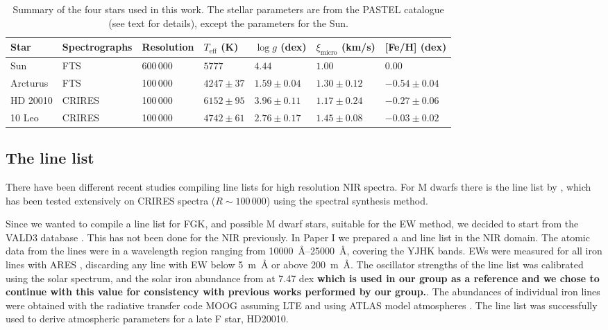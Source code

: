 \documentclass{aa}
\begin{document}
\begin{table}[htb!]
    \caption{Summary of the four stars used in this work. The stellar parameters
             are from the PASTEL catalogue \citep{Soubiran2016} (see text for
             details), except the parameters for the Sun.}
    \label{tab:stars}
    \centering
    \begin{tabular}{lllllll}
      \hline\hline
        Star        & Spectrographs  & Resolution  & $T_\mathrm{eff}$ (K) &  $\log g$ (dex)  &   $\xi_\mathrm{micro}$ (km/s)   & [Fe/H] (dex)      \\
      \hline
        Sun         & FTS            & 600\,000    & $5777$               &  $4.44$          &    $1.00$                       & $ 0.00$          \\
        Arcturus    & FTS            & 100\,000    & $4247 \pm  37$       &  $1.59 \pm 0.04$ &    $1.30 \pm 0.12$              & $-0.54 \pm 0.04$ \\
        HD 20010    & CRIRES         & 100\,000    & $6152 \pm  95$       &  $3.96 \pm 0.11$ &    $1.17 \pm 0.24$              & $-0.27 \pm 0.06$ \\
        10 Leo      & CRIRES         & 100\,000    & $4742 \pm  61$       &  $2.76 \pm 0.17$ &    $1.45 \pm 0.08$              & $-0.03 \pm 0.02$ \\
      \hline
    \end{tabular}
\end{table}

\subsection{The line list}

There have been different recent studies compiling line lists for high resolution NIR spectra. For M
dwarfs there is the line list by \citet{Onehag2012,Lindgren2016}, which has been tested extensively
on CRIRES spectra ($R\sim100\,000$) using the spectral synthesis method.

Since we wanted to compile a line list for FGK, and possible M dwarf stars, suitable for the EW
method, we decided to start from the VALD3 database \citep{VALD1,VALD2}. This has not been done for
the NIR previously. In Paper I we prepared a  and  line list in the NIR
domain. The atomic data from the lines were in a wavelength region ranging from
\SIrange{10000}{25000}{\AA}, covering the YJHK bands. EWs were measured for all iron lines with ARES
\citep{Sousa2015a}, discarding any line with EW below \SI{5}{m\AA} or above \SI{200}{m\AA}. The
oscillator strengths of the line list was calibrated using the solar spectrum, and the solar iron
abundance from \citet{Gonzalez2000} at 7.47 dex {\bf which is used in our group as a reference and
we chose to continue with this value for consistency with previous works performed by our group.}.
The abundances of individual iron lines were obtained with the radiative transfer code MOOG
\citep{Sneden1973} assuming LTE and using ATLAS model atmospheres \citep{Kurucz1993}. The line list
was successfully used to derive atmospheric parameters for a late F star, HD20010.
\end{document}
